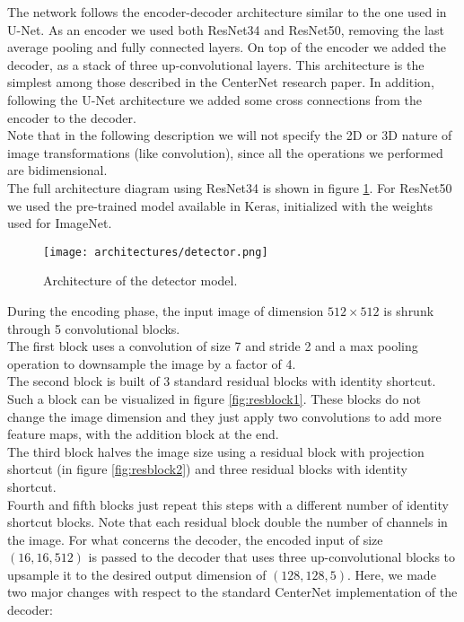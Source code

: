 The network follows the encoder-decoder architecture similar to the one used in U-Net. As an encoder we used both ResNet34 and ResNet50, removing the last average pooling and fully connected layers. On top of the encoder we added the decoder, as a stack of three up-convolutional layers. This architecture is the simplest among those described in the CenterNet research paper. In addition, following the U-Net architecture we added some cross connections from the encoder to the decoder.\\
Note that in the following description we will not specify the 2D or 3D nature of image transformations (like convolution), since all the operations we performed are bidimensional.\\
The full architecture diagram using ResNet34 is shown in figure \ref{fig:detector}. For ResNet50 we used the pre-trained model available in Keras, initialized with the weights used for ImageNet.\\

\begin{figure}[h]
	\caption{Architecture of the detector model.}
	\centering
	\texttt{[image: architectures/detector.png]}
	\label{fig:detector}
\end{figure}

\noindent During the encoding phase, the input image of dimension $512 \times 512$ is shrunk through 5 convolutional blocks.\\
The first block uses a convolution of size 7 and stride 2 and a max pooling operation to downsample the image by a factor of 4.\\
The second block is built of 3 standard residual blocks with identity shortcut. Such a block can be visualized in figure \ref{fig:resblock1}. These blocks do not change the image dimension and they just apply two convolutions to add more feature maps, with the addition block at the end.\\
The third block halves the image size using a residual block with projection shortcut (in figure \ref{fig:resblock2}) and three residual blocks with identity shortcut.\\
Fourth and fifth blocks just repeat this steps with a different number of identity shortcut blocks. Note that each residual block double the number of channels in the image. For what concerns the decoder, the encoded input of size $(16, 16, 512)$ is passed to the decoder that uses three up-convolutional blocks to upsample it to the desired output dimension of $(128, 128, 5)$. Here, we made two major changes with respect to the standard CenterNet implementation of the decoder:

